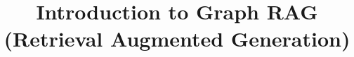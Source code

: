 \documentclass[xcolor=dvipsnames,compress,t,pdf,9pt]{beamer}
\title[\insertframenumber /\inserttotalframenumber]{Introduction to Graph RAG (Retrieval Augmented Generation)}
\begin{document}
	\begin{frame}
	\titlepage
	\end{frame}
	

	
	
	
\end{document}
